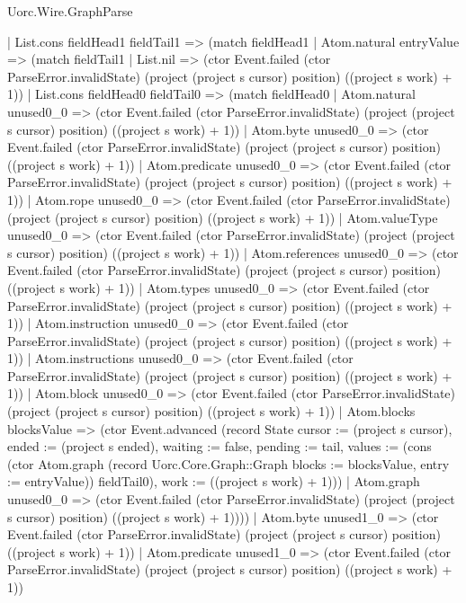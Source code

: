 \begin{lexlean}{Uorc.Wire.GraphParse}
\begin{semanticmodule}
{        | List.cons fieldHead1 fieldTail1 => (match fieldHead1
          | Atom.natural entryValue => (match fieldTail1
            | List.nil => (ctor Event.failed (ctor ParseError.invalidState) (project (project s cursor) position) ((project s work) + 1))
            | List.cons fieldHead0 fieldTail0 => (match fieldHead0
              | Atom.natural unused0_0 => (ctor Event.failed (ctor ParseError.invalidState) (project (project s cursor) position) ((project s work) + 1))
              | Atom.byte unused0_0 => (ctor Event.failed (ctor ParseError.invalidState) (project (project s cursor) position) ((project s work) + 1))
              | Atom.predicate unused0_0 => (ctor Event.failed (ctor ParseError.invalidState) (project (project s cursor) position) ((project s work) + 1))
              | Atom.rope unused0_0 => (ctor Event.failed (ctor ParseError.invalidState) (project (project s cursor) position) ((project s work) + 1))
              | Atom.valueType unused0_0 => (ctor Event.failed (ctor ParseError.invalidState) (project (project s cursor) position) ((project s work) + 1))
              | Atom.references unused0_0 => (ctor Event.failed (ctor ParseError.invalidState) (project (project s cursor) position) ((project s work) + 1))
              | Atom.types unused0_0 => (ctor Event.failed (ctor ParseError.invalidState) (project (project s cursor) position) ((project s work) + 1))
              | Atom.instruction unused0_0 => (ctor Event.failed (ctor ParseError.invalidState) (project (project s cursor) position) ((project s work) + 1))
              | Atom.instructions unused0_0 => (ctor Event.failed (ctor ParseError.invalidState) (project (project s cursor) position) ((project s work) + 1))
              | Atom.block unused0_0 => (ctor Event.failed (ctor ParseError.invalidState) (project (project s cursor) position) ((project s work) + 1))
              | Atom.blocks blocksValue => (ctor Event.advanced (record State {cursor := (project s cursor), ended := (project s ended), waiting := false, pending := tail, values := (cons (ctor Atom.graph (record Uorc.Core.Graph::Graph {blocks := blocksValue, entry := entryValue})) fieldTail0), work := ((project s work) + 1)}))
              | Atom.graph unused0_0 => (ctor Event.failed (ctor ParseError.invalidState) (project (project s cursor) position) ((project s work) + 1))))
          | Atom.byte unused1_0 => (ctor Event.failed (ctor ParseError.invalidState) (project (project s cursor) position) ((project s work) + 1))
          | Atom.predicate unused1_0 => (ctor Event.failed (ctor ParseError.invalidState) (project (project s cursor) position) ((project s work) + 1))
}
\end{semanticmodule}
\end{lexlean}
